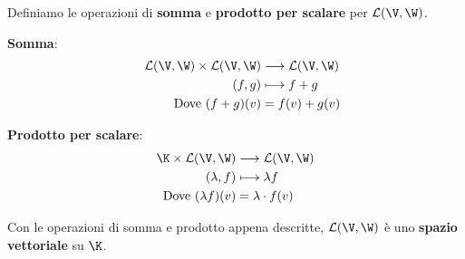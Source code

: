 \documentclass[11pt, a4paper, titlepage, oneside]{scrbook}
\begin{document}
Definiamo le operazioni di \textbf{somma} e \textbf{prodotto per scalare} per $\mathcal{L}(\V, \W)$.

\bigskip

\begin{minipage}[c]{0.45\textwidth}
    \centering
    {\Large\textbf{Somma}:}
    \begin{align*}
        \hspace{0.4cm}\mathcal{L}(\V, \W) \times \mathcal{L}(\V, \W) &\longrightarrow \mathcal{L}(\V, \W) \\
        \hspace{0.4cm}(f,g) &\longmapsto f+g \\
        \hspace{0.4cm}\text{Dove } (f + g)(v) &= f(v) + g(v)
    \end{align*}
\end{minipage}
\begin{minipage}[c]{0.45\textwidth}
    \centering
    {\Large\textbf{Prodotto per scalare}:}
    \begin{align*}
        \K \times \mathcal{L}(\V, \W) &\longrightarrow \mathcal{L}(\V, \W) \\
        (\lambda,f) &\longmapsto \lambda f \\
        \text{Dove } (\lambda f)(v) &= \lambda \cdot f(v)
    \end{align*}
\end{minipage}

\bigskip

\begin{Proposizione}[]
\label{propos-insieme-app-lin-spaz-vett}
Con le operazioni di somma e prodotto appena descritte, $\mathcal{L}(\V, \W)$ è uno \textbf{spazio vettoriale} su $\K$.
\end{Proposizione}

\Dimostrazione \nopagebreak
\end{document}
